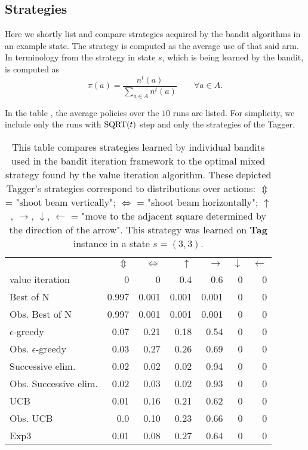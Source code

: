 \documentclass[../main.tex]{subfiles}
\begin{document}
\subsection{Strategies}
Here we shortly list and compare strategies acquired by the bandit algorithms in an example state.
The strategy is computed as the average use of that said arm.
In terminology from  the strategy in state $s$, which is being learned by the bandit, is computed as
\begin{equation}
    \pi(a) = \frac{n^t(a)}{\sum_{a \in A}n^t(a)} \qquad \forall a \in A.
\end{equation}

In the table , the average policies over the $10$ runs are listed.
For simplicity, we include only the runs with $\text{SQRT}(t)$ step and only the strategies of the Tagger.
\begin{table}
    \centering
    \begin{tabular}{ l | r | r | r | r | r | r }
         & $\Updownarrow$ & $\Leftrightarrow$ & $\uparrow$ & $\rightarrow$ & $\downarrow$ & $\leftarrow$ \\
        \hhline{=|=|=|=|=|=|=}
        \rowcolor{lightgray} value iteration & 0 & 0 & 0.4 & 0.6 & 0 & 0 \\
        \hline
        Best of N & 0.997 & 0.001 & 0.001 & 0.001 & 0 & 0 \\
        Obs. Best of N & 0.997 & 0.001 & 0.001 & 0.001 & 0 & 0 \\
        \hline
        $\epsilon$-greedy & 0.07 & 0.21 & 0.18 & 0.54 & 0 & 0 \\
        Obs. $\epsilon$-greedy & 0.03 & 0.27 & 0.26 & 0.69 & 0 & 0 \\
        \hline
        Successive elim. & 0.02 & 0.02 & 0.02 & 0.94 & 0 & 0 \\
        Obs. Successive elim. & 0.02 & 0.03 & 0.02 & 0.93 & 0 & 0 \\
        \hline
        UCB & 0.01 & 0.16 & 0.21 & 0.62 & 0 & 0 \\
        Obs. UCB & 0.0 & 0.10 & 0.23 & 0.66 & 0 & 0 \\
        \hline
        Exp3 & 0.01 & 0.08 & 0.27 & 0.64 & 0 & 0
    \end{tabular}
    \caption[Tagger's strategies on  in a state $s = \left(3, 3\right)$]{
        This table compares strategies learned by individual bandits used in the bandit iteration framework to the optimal mixed strategy found by the value iteration algorithm.
        These depicted Tagger's strategies correspond to distributions over actions: $\Updownarrow$ = "shoot beam vertically"; $\Leftrightarrow$ = "shoot beam horizontally"; $\uparrow$, $\rightarrow$, $\downarrow$, $\leftarrow$ = "move to the adjacent square determined by the direction of the arrow".
        This strategy was learned on \textbf{Tag} instance  in a state $s = \left(3, 3\right)$.
    }
    \label{exp:sg:strategies}
\end{table}
\end{document}
